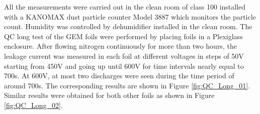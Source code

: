 All the measurements were carried out in the clean room of class 100 installed with a KANOMAX dust particle counter Model 3887 \cite{fourteen} which monitors the particle count. Humidity was controlled by dehumidifier installed in the clean room.
The QC long test of the GEM foils were performed by placing foils in a Plexiglass enclosure. After flowing nitrogen continuously for more than two hours, the leakage current was measured in each foil at different voltages in steps of 50V starting from 450V and going up until 600V for time intervals nearly equal to 700s.
At 600V, at most two discharges were seen during the time period of around 700s. The corresponding results are shown in Figure \ref{fig:QC_Long_01}. Similar results were obtained for both other foils as shown in Figure \ref{fig:QC_Long_02}.






% 





